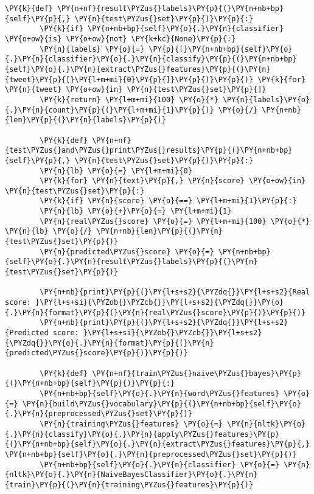 \begin{tcolorbox}[breakable, size=fbox, boxrule=1pt, pad at break*=1mm,colback=cellbackground, colframe=cellborder]
\begin{Verbatim}[commandchars=\\\{\}]
        \PY{k}{def} \PY{n+nf}{result\PYZus{}labels}\PY{p}{(}\PY{n+nb+bp}{self}\PY{p}{,} \PY{n}{test\PYZus{}set}\PY{p}{)}\PY{p}{:}
        \PY{k}{if} \PY{n+nb+bp}{self}\PY{o}{.}\PY{n}{classifier} \PY{o+ow}{is} \PY{o+ow}{not} \PY{k+kc}{None}\PY{p}{:}
        \PY{n}{labels} \PY{o}{=} \PY{p}{[}\PY{n+nb+bp}{self}\PY{o}{.}\PY{n}{classifier}\PY{o}{.}\PY{n}{classify}\PY{p}{(}\PY{n+nb+bp}{self}\PY{o}{.}\PY{n}{extract\PYZus{}features}\PY{p}{(}\PY{n}{tweet}\PY{p}{[}\PY{l+m+mi}{0}\PY{p}{]}\PY{p}{)}\PY{p}{)} \PY{k}{for} \PY{n}{tweet} \PY{o+ow}{in} \PY{n}{test\PYZus{}set}\PY{p}{]}
        \PY{k}{return} \PY{l+m+mi}{100} \PY{o}{*} \PY{n}{labels}\PY{o}{.}\PY{n}{count}\PY{p}{(}\PY{l+m+mi}{1}\PY{p}{)} \PY{o}{/} \PY{n+nb}{len}\PY{p}{(}\PY{n}{labels}\PY{p}{)}

        \PY{k}{def} \PY{n+nf}{test\PYZus{}and\PYZus{}print\PYZus{}results}\PY{p}{(}\PY{n+nb+bp}{self}\PY{p}{,} \PY{n}{test\PYZus{}set}\PY{p}{)}\PY{p}{:}
        \PY{n}{lb} \PY{o}{=} \PY{l+m+mi}{0}
        \PY{k}{for} \PY{n}{text}\PY{p}{,} \PY{n}{score} \PY{o+ow}{in} \PY{n}{test\PYZus{}set}\PY{p}{:}
        \PY{k}{if} \PY{n}{score} \PY{o}{==} \PY{l+m+mi}{1}\PY{p}{:}
        \PY{n}{lb} \PY{o}{+}\PY{o}{=} \PY{l+m+mi}{1}
        \PY{n}{real\PYZus{}score} \PY{o}{=} \PY{l+m+mi}{100} \PY{o}{*} \PY{n}{lb} \PY{o}{/} \PY{n+nb}{len}\PY{p}{(}\PY{n}{test\PYZus{}set}\PY{p}{)}
        \PY{n}{predicted\PYZus{}score} \PY{o}{=} \PY{n+nb+bp}{self}\PY{o}{.}\PY{n}{result\PYZus{}labels}\PY{p}{(}\PY{n}{test\PYZus{}set}\PY{p}{)}

        \PY{n+nb}{print}\PY{p}{(}\PY{l+s+s2}{\PYZdq{}}\PY{l+s+s2}{Real score: }\PY{l+s+si}{\PYZob{}\PYZcb{}}\PY{l+s+s2}{\PYZdq{}}\PY{o}{.}\PY{n}{format}\PY{p}{(}\PY{n}{real\PYZus{}score}\PY{p}{)}\PY{p}{)}
        \PY{n+nb}{print}\PY{p}{(}\PY{l+s+s2}{\PYZdq{}}\PY{l+s+s2}{Predicted score: }\PY{l+s+si}{\PYZob{}\PYZcb{}}\PY{l+s+s2}{\PYZdq{}}\PY{o}{.}\PY{n}{format}\PY{p}{(}\PY{n}{predicted\PYZus{}score}\PY{p}{)}\PY{p}{)}

        \PY{k}{def} \PY{n+nf}{train\PYZus{}naive\PYZus{}bayes}\PY{p}{(}\PY{n+nb+bp}{self}\PY{p}{)}\PY{p}{:}
        \PY{n+nb+bp}{self}\PY{o}{.}\PY{n}{word\PYZus{}features} \PY{o}{=} \PY{n}{build\PYZus{}vocabulary}\PY{p}{(}\PY{n+nb+bp}{self}\PY{o}{.}\PY{n}{preprocessed\PYZus{}set}\PY{p}{)}
        \PY{n}{training\PYZus{}features} \PY{o}{=} \PY{n}{nltk}\PY{o}{.}\PY{n}{classify}\PY{o}{.}\PY{n}{apply\PYZus{}features}\PY{p}{(}\PY{n+nb+bp}{self}\PY{o}{.}\PY{n}{extract\PYZus{}features}\PY{p}{,} \PY{n+nb+bp}{self}\PY{o}{.}\PY{n}{preprocessed\PYZus{}set}\PY{p}{)}
        \PY{n+nb+bp}{self}\PY{o}{.}\PY{n}{classifier} \PY{o}{=} \PY{n}{nltk}\PY{o}{.}\PY{n}{NaiveBayesClassifier}\PY{o}{.}\PY{n}{train}\PY{p}{(}\PY{n}{training\PYZus{}features}\PY{p}{)}
    \end{Verbatim}
\end{tcolorbox}

